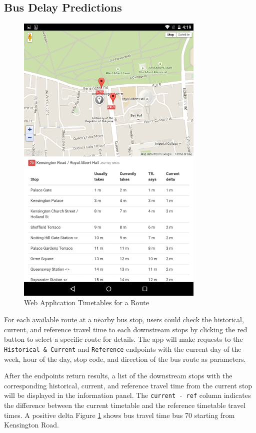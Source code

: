 \subsection{Bus Delay Predictions}
\begin{figure}
\centering
\includegraphics[width=0.8\textwidth]{figures/timetables.png}
\caption{\label{fig:timetable_view} Web Application Timetables for a Route}
\end{figure}

\par For each available route at a nearby bus stop, users could check the historical, current, and reference travel time to each downstream stops by clicking the red button to select a specific route for details. The app will make requests to the \texttt{Historical \& Current} and \texttt{Reference} endpoints with the current day of the week, hour of the day, stop code, and direction of the bus route as parameters.

\par After the endpoints return results, a list of the downstream stops with the corresponding historical, current, and reference travel time from the current stop will be displayed in the information panel. The \texttt{current - ref} column indicates the difference between the current timetable and the reference timetable travel times. A positive delta Figure \ref{fig:timetable_view} shows bus travel time bus 70 starting from Kensington Road.

